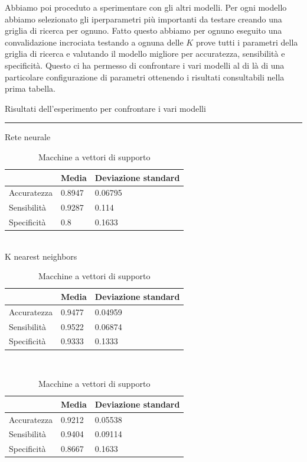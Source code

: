 \documentclass[a4paper,12pt]{report}
\begin{document}
Abbiamo poi proceduto a sperimentare con gli altri modelli. Per ogni
modello abbiamo selezionato gli iperparametri più importanti da testare creando
una griglia di ricerca per ognuno. Fatto questo abbiamo per ognuno eseguito una
convalidazione incrociata testando a ognuna delle $K$ prove tutti i parametri
della griglia di ricerca e valutando il modello migliore per accuratezza,
sensibilità e specificità. Questo ci ha permesso di confrontare i vari modelli al
di là di una particolare configurazione di parametri ottenendo i risultati
consultabili nella prima tabella.


\begin{table}
	\caption{Risultati dell'esperimento per confrontare i vari modelli}
	\rule{\textwidth}{0.25mm}

	\caption{Rete neurale}
	\begin{tabular}{|l|l|l|}
	\hline
                & Media     & Deviazione standard	\\ \hline
	Accuratezza & 0.8947	& 0.06795				\\ \hline
    Sensibilità & 0.9287	& 0.114					\\ \hline
    Specificità & 0.8		& 0.1633				\\ \hline
	\end{tabular}
	\\


	\caption{K nearest neighbors}
	\begin{tabular}{|l|l|l|}
	\hline
                & Media     & Deviazione standard	\\ \hline
	Accuratezza & 0.9477	& 0.04959				\\ \hline
    Sensibilità & 0.9522	& 0.06874				\\ \hline
    Specificità & 0.9333	& 0.1333				\\ \hline
	\end{tabular}
	\\


	\caption{Macchine a vettori di supporto}
	\begin{tabular}{|l|l|l|}
	\hline
                & Media     & Deviazione standard	\\ \hline
	Accuratezza & 0.9212	& 0.05538				\\ \hline
    Sensibilità & 0.9404	& 0.09114				\\ \hline
    Specificità & 0.8667	& 0.1633				\\ \hline
	\end{tabular}
	\\



\end{table}
\end{document}
